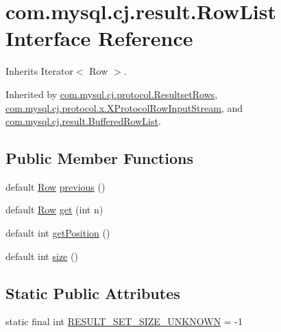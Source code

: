 \hypertarget{interfacecom_1_1mysql_1_1cj_1_1result_1_1_row_list}{}\section{com.\+mysql.\+cj.\+result.\+Row\+List Interface Reference}
\label{interfacecom_1_1mysql_1_1cj_1_1result_1_1_row_list}


Inherits Iterator$<$ Row $>$.



Inherited by \mbox{\hyperlink{interfacecom_1_1mysql_1_1cj_1_1protocol_1_1_resultset_rows}{com.\+mysql.\+cj.\+protocol.\+Resultset\+Rows}}, \mbox{\hyperlink{classcom_1_1mysql_1_1cj_1_1protocol_1_1x_1_1_x_protocol_row_input_stream}{com.\+mysql.\+cj.\+protocol.\+x.\+X\+Protocol\+Row\+Input\+Stream}}, and \mbox{\hyperlink{classcom_1_1mysql_1_1cj_1_1result_1_1_buffered_row_list}{com.\+mysql.\+cj.\+result.\+Buffered\+Row\+List}}.

\subsection*{Public Member Functions}
\begin{DoxyCompactItemize}
\item 
default \mbox{\hyperlink{interfacecom_1_1mysql_1_1cj_1_1result_1_1_row}{Row}} \mbox{\hyperlink{interfacecom_1_1mysql_1_1cj_1_1result_1_1_row_list_a8fcbee0be0e6e13ee3862c46ec7e8e39}{previous}} ()
\item 
default \mbox{\hyperlink{interfacecom_1_1mysql_1_1cj_1_1result_1_1_row}{Row}} \mbox{\hyperlink{interfacecom_1_1mysql_1_1cj_1_1result_1_1_row_list_ac5f33b198acdb87ba7ab84da6cddef93}{get}} (int n)
\item 
default int \mbox{\hyperlink{interfacecom_1_1mysql_1_1cj_1_1result_1_1_row_list_a403554a1f4945bd623ed3b7489674a2e}{get\+Position}} ()
\item 
default int \mbox{\hyperlink{interfacecom_1_1mysql_1_1cj_1_1result_1_1_row_list_a2b6e2d9ed59e362e06b9fc8a110ccd89}{size}} ()
\end{DoxyCompactItemize}
\subsection*{Static Public Attributes}
\begin{DoxyCompactItemize}
\item 
static final int \mbox{\hyperlink{interfacecom_1_1mysql_1_1cj_1_1result_1_1_row_list_ab7beb738ba9b15d5697c610b86282ac9}{R\+E\+S\+U\+L\+T\+\_\+\+S\+E\+T\+\_\+\+S\+I\+Z\+E\+\_\+\+U\+N\+K\+N\+O\+WN}} = -\/1
\end{DoxyCompactItemize}


